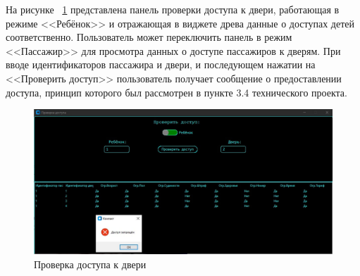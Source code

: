 На рисунке ~\ref{fig:example10} представлена панель проверки доступа к двери, работающая в режиме <<Ребёнок>> и отражающая в виджете древа данные о доступах детей соответственно. Пользователь может переключить панель в режим <<Пассажир>> для просмотра данных о доступе пассажиров к дверям. При вводе идентификаторов пассажира и двери, и последующем нажатии на <<Проверить доступ>> пользователь получает сообщение о предоставлении доступа, принцип которого был рассмотрен в пункте 3.4 технического проекта.
\begin{figure}[ht]
	\centering
	\includegraphics[width=1\linewidth]{images/Example10}
	\caption{Проверка доступа к двери}
	\label{fig:example10}
\end{figure}

\newpage